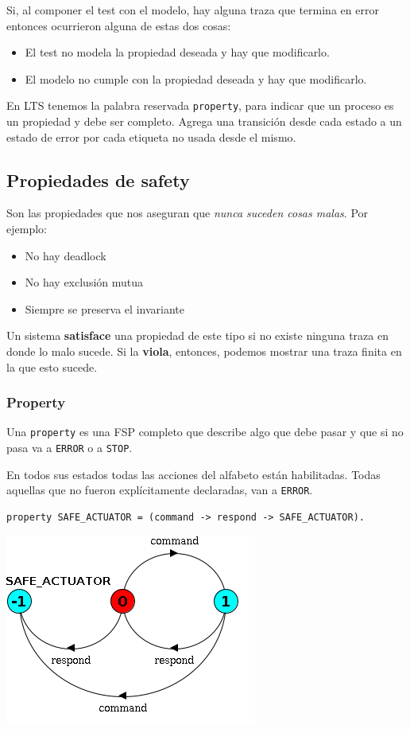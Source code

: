 Si, al componer el test con el modelo, hay alguna traza que termina en error entonces ocurrieron alguna de estas dos cosas:

\begin{itemize}
\item El test no modela la propiedad deseada y hay que modificarlo.
\item El modelo no cumple con la propiedad deseada y hay que modificarlo.
\end{itemize}

En LTS tenemos la palabra reservada \texttt{property}, para indicar que un proceso es un propiedad y debe ser completo. Agrega una transición desde cada estado a un estado de error por cada etiqueta no usada desde el mismo.

\subsection{Propiedades de safety}
Son las propiedades que nos aseguran que \textit{nunca suceden cosas malas}. Por ejemplo:
\begin{itemize}
\item No hay deadlock
\item No hay exclusión mutua
\item Siempre se preserva el invariante
\end{itemize}

Un sistema \textbf{satisface} una propiedad de este tipo si no existe ninguna traza en donde lo malo sucede. Si la \textbf{viola}, entonces, podemos mostrar una traza finita en la que esto sucede. 

\subsubsection{Property}
Una \texttt{property} es una FSP completo que describe algo que debe pasar y que si no pasa va a \texttt{ERROR} o a \texttt{STOP}.

En todos sus estados todas las acciones del alfabeto están habilitadas. Todas aquellas que no fueron explícitamente declaradas, van a \texttt{ERROR}.


\begin{verbatim}
property SAFE_ACTUATOR = (command -> respond -> SAFE_ACTUATOR).
\end{verbatim}

\begin{center}
	\includegraphics[scale=0.5]{imagenes/lts-safeActuator}
\end{center}


